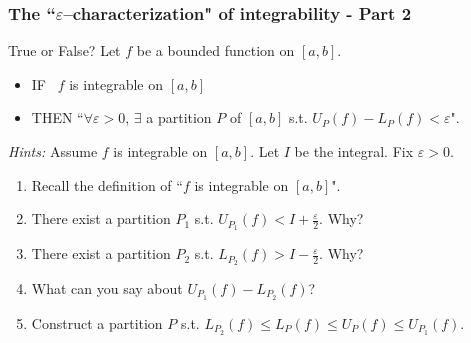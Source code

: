 \begin{frame}[t]
	\fontsize{11}{11}\selectfont
	\frametitle{The ``$\varepsilon$--characterization" of integrability - Part 2}

	\begin{block}{\fontsize{11}{11}\selectfont True or False?}
		Let $f$ be a bounded function on $[a,b]$.
		\begin{itemize}
			\item IF \quad \quad \, $f$ is integrable on $[a,b]$

			\item THEN \hfill ``$\forall \varepsilon>0$, $\exists$ a partition $P$ of
				$[a,b]$ s.t. $\displaystyle U_{P}(f) - L_{P}(f) < \varepsilon$".
		\end{itemize}
	\end{block}

	\emph{Hints:} Assume $f$ is integrable on $[a,b]$. Let $I$ be the integral. Fix
	$\varepsilon>0$.
	\begin{enumerate}
		\item Recall the definition of ``$f$ is integrable on $[a,b]$".

		\item There exist a partition $P_{1}$ s.t.
			$\displaystyle U_{P_1}(f) < I + \frac{\varepsilon}{2}$. Why?

		\item There exist a partition $P_{2}$ s.t.
			$\displaystyle L_{P_2}(f) > I - \frac{\varepsilon}{2}$. Why?

		\item What can you say about $\displaystyle U_{P_1}(f) - L_{P_2}(f)$?
			\vspace{.1cm}

		\item Construct a partition $P$ s.t.
			$\displaystyle L_{P_2}(f) \leq L_{P}(f) \leq U_{P}(f) \leq U_{P_1}(f)$.
	\end{enumerate}
\end{frame}


